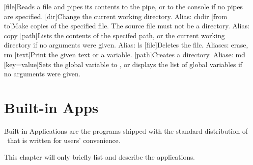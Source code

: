 \begin{outline}
\1[file]{Reads a file and pipes its contents to the pipe, or to the console if no pipes are specified.}
\1[dir]{Change the current working directory. Alias: chdir}
\1
\1[from to]{Make copies of the specified file. The source file must not be a directory. Alias: copy}
\1
\1[path]{Lists the contents of the specifed path, or the current working directory if no arguments were given. Alias: ls}
\1[file]{Deletes the file. Aliases: erase, rm}
\1[text]{Print the given text or a variable.}
\1
\1[path]{Creates a directory. Aliase: md}
\1
\1[key=value]{Sets the global variable  to , or displays the list of global variables if no arguments were given.}
\1
\end{outline}



\chapter{Built-in Apps}

Built-in Applications are the programs shipped with the standard distribution of \thedos\ that is written for users' convenience.

This chapter will only briefly list and describe the applications.

